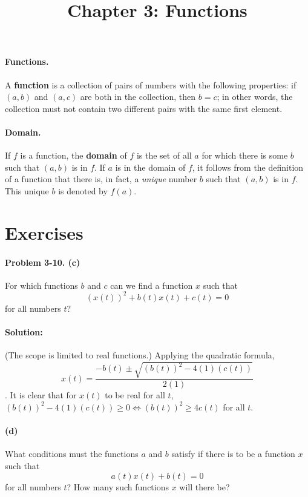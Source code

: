 \documentclass{article}
\begin{document}
\title{Chapter 3: Functions}
\maketitle

\paragraph{Functions.} A \textbf{function} is a collection of pairs of numbers
with the following properties: if $(a, b)$ and $(a, c)$ are both in the
collection, then $b = c$; in other words, the collection must not contain two
different pairs with the same first element.

\paragraph{Domain.} If $f$ is a function, the \textbf{domain} of $f$ is the set
of all $a$ for which there is some $b$ such that $(a, b)$ is in $f$. If $a$ is
in the domain of $f$, it follows from the definition of a function that there
is, in fact, a \emph{unique} number $b$ such that $(a, b)$ is in $f$. This
unique $b$ is denoted by $f(a)$.

\section*{Exercises}

\paragraph{Problem 3-10. (c)} For which functions $b$ and $c$ can we find a function $x$ such
that \begin{equation*}
  (x(t))^2 + b(t)x(t) + c(t) = 0
\end{equation*} for all numbers $t$?

\paragraph{Solution:} (The scope is limited to real functions.) Applying the
quadratic formula, \begin{equation*}
  x(t) = \frac{-b(t) \pm \sqrt{(b(t))^2 - 4(1)(c(t))}}{2(1)}
\end{equation*}. It is clear that for $x(t)$ to be real for all $t$, $(b(t))^2
- 4(1)(c(t)) \geq 0 \iff (b(t))^2 \geq 4c(t)$ for all $t$.

\paragraph{(d)} What conditions must the functions $a$ and $b$ satisfy if there
is to be a function $x$ such that \begin{equation*}
  a(t)x(t) + b(t) = 0
\end{equation*} for all numbers $t$? How many such functions $x$ will there be?
\end{document}
